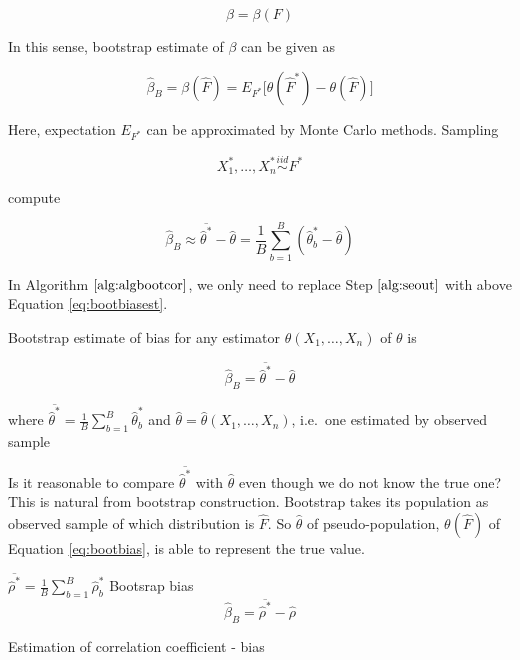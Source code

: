 \documentclass[]{book}
\theoremstyle{definition}
\theoremstyle{definition}
\theoremstyle{definition}
\theoremstyle{remark}
\let\BeginKnitrBlock\begin \let\EndKnitrBlock\end
\begin{document}
\[\beta = \beta(F)\]

In this sense, bootstrap estimate of \(\beta\) can be given as

\begin{equation}
  \hat\beta_B = \beta(\hat{F}) = E_{F^{\ast}} \Big[ \theta(\hat{F}^{\ast}) - \theta(\hat{F}) \Big]
  \label{eq:bootbias}
\end{equation}

Here, expectation \(E_{F^{\ast}}\) can be approximated by Monte Carlo methods. Sampling

\[X_1^{\ast}, \ldots, X_n^{\ast} \stackrel{iid}{\sim}F^{\ast}\]

compute

\begin{equation}
  \hat\beta_B \approx \overline{\hat\theta^{\ast}} - \hat\theta = \frac{1}{B} \sum_{b = 1}^B ( \hat\theta_b^{\ast} - \hat\theta)
  \label{eq:bootbiasest}
\end{equation}

In Algorithm \(\ref{alg:algbootcor}\), we only need to replace Step \(\ref{alg:seout}\) with above Equation \eqref{eq:bootbiasest}.

\BeginKnitrBlock{theorem}[Bootstrap Bias]
\protect\hypertarget{thm:bootbet}{}{\label{thm:bootbet} {} }Bootstrap estimate of bias for any estimator \(\hat\theta(X_1, \ldots, X_n)\) of \(\theta\) is

\[\hat\beta_B = \overline{\hat\theta^{\ast}} - \hat\theta\]

where \(\overline{\hat\theta^{\ast}} = \frac{1}{B} \sum\limits_{b = 1}^B \hat\theta_b^{\ast}\) and \(\hat\theta = \hat\theta(X_1, \ldots, X_n)\), i.e.~one estimated by observed sample
\EndKnitrBlock{theorem}

Is it reasonable to compare \(\overline{\hat\theta^{\ast}}\) with \(\hat\theta\) even though we do not know the true one? This is natural from bootstrap construction. Bootstrap takes its population as observed sample of which distribution is \(\hat{F}\). So \(\hat\theta\) of pseudo-population, \(\theta(\hat{F})\) of Equation \eqref{eq:bootbias}, is able to represent the true value.

\begin{algorithm}[H] \label{alg:algbootcor2}
  \SetAlgoLined
  $\overline{\hat\rho^{\ast}} = \frac{1}{B} \sum\limits_{b = 1}^B \hat\rho_b^{\ast}$\;
  Bootsrap bias $$\hat\beta_B = \overline{\hat\rho^{\ast}} - \hat\rho$$\; \label{alg:biasout}
  \caption{Estimation of correlation coefficient - bias}
\end{algorithm}
\end{document}

